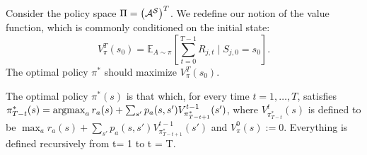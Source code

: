 \documentclass[11pt]{article}
\begin{document}
Consider the policy space $\Pi = \left(\mathcal{A}^{\mathcal{S}}\right)^{T}$. We redefine our notion of the value function, which is commonly conditioned on the initial state:
\begin{equation}
	\label{eq:valuefcn}
	V_{\pi}^{T}\left(s_{0}\right) = \mathbb{E}_{A\sim\pi}\left[\sum_{t=0}^{T-1} R_{j,t} \mid S_{j,0} = s_{0}\right].
\end{equation}
The optimal policy $\pi^{*}$ should maximize $V_{\pi}^{T}(s_{0})$.

\begin{proposition}
	The optimal policy $\pi^*(s)$ is that which, for every time $t=1,\ldots, T$, satisfies $\pi^*_{T-t}(s) = \operatorname*{argmax}_a r_{a}(s) + \sum_{s'} p_{a}(s,s') V_{\pi^*_{T-t+1}}^{t-1}(s')$, where $V_{\pi^*_{T-t}}^{t}(s)$ is defined to be $\max_{a} r_{a}(s) + \sum_{s'} p_{a}(s,s') V_{\pi^{*}_{T-t+1}}^{t-1}(s')$ and $V_{\pi}^{0}(s) := 0$. Everything is defined recursively from t= 1 to t = T.
	
	
\end{proposition}
\end{document}
